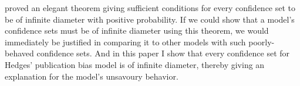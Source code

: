 \textcite{Gleser1987-ii} proved an elegant theorem giving sufficient conditions for every confidence set to be of infinite diameter with positive probability. If we could show that a model's confidence sets must be of infinite diameter using this theorem, we would immediately be justified in comparing it to other models with such poorly-behaved confidence sets. And in this paper I show that every confidence set for Hedges' publication bias model is of infinite diameter, thereby giving an explanation for the model's unsavoury behavior.
